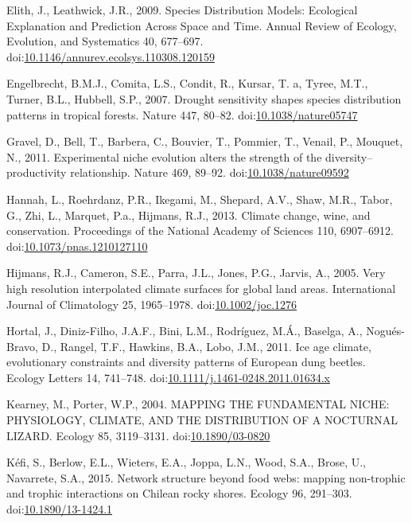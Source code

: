 \hypertarget{ref-Elith2009a}{}
Elith, J., Leathwick, J.R., 2009. Species Distribution Models:
Ecological Explanation and Prediction Across Space and Time. Annual
Review of Ecology, Evolution, and Systematics 40, 677--697.
doi:\href{https://doi.org/10.1146/annurev.ecolsys.110308.120159}{10.1146/annurev.ecolsys.110308.120159}

\hypertarget{ref-Engelbrecht2007}{}
Engelbrecht, B.M.J., Comita, L.S., Condit, R., Kursar, T. a, Tyree,
M.T., Turner, B.L., Hubbell, S.P., 2007. Drought sensitivity shapes
species distribution patterns in tropical forests. Nature 447, 80--82.
doi:\href{https://doi.org/10.1038/nature05747}{10.1038/nature05747}

\hypertarget{ref-Gravel2011c}{}
Gravel, D., Bell, T., Barbera, C., Bouvier, T., Pommier, T., Venail, P.,
Mouquet, N., 2011. Experimental niche evolution alters the strength of
the diversity--productivity relationship. Nature 469, 89--92.
doi:\href{https://doi.org/10.1038/nature09592}{10.1038/nature09592}

\hypertarget{ref-Hannah2013}{}
Hannah, L., Roehrdanz, P.R., Ikegami, M., Shepard, A.V., Shaw, M.R.,
Tabor, G., Zhi, L., Marquet, P.a., Hijmans, R.J., 2013. Climate change,
wine, and conservation. Proceedings of the National Academy of Sciences
110, 6907--6912.
doi:\href{https://doi.org/10.1073/pnas.1210127110}{10.1073/pnas.1210127110}

\hypertarget{ref-Hijmans2005}{}
Hijmans, R.J., Cameron, S.E., Parra, J.L., Jones, P.G., Jarvis, A.,
2005. Very high resolution interpolated climate surfaces for global land
areas. International Journal of Climatology 25, 1965--1978.
doi:\href{https://doi.org/10.1002/joc.1276}{10.1002/joc.1276}

\hypertarget{ref-Hortal2011}{}
Hortal, J., Diniz-Filho, J.A.F., Bini, L.M., Rodríguez, M.Á., Baselga,
A., Nogués-Bravo, D., Rangel, T.F., Hawkins, B.A., Lobo, J.M., 2011. Ice
age climate, evolutionary constraints and diversity patterns of European
dung beetles. Ecology Letters 14, 741--748.
doi:\href{https://doi.org/10.1111/j.1461-0248.2011.01634.x}{10.1111/j.1461-0248.2011.01634.x}

\hypertarget{ref-Kearney2004}{}
Kearney, M., Porter, W.P., 2004. MAPPING THE FUNDAMENTAL NICHE:
PHYSIOLOGY, CLIMATE, AND THE DISTRIBUTION OF A NOCTURNAL LIZARD. Ecology
85, 3119--3131.
doi:\href{https://doi.org/10.1890/03-0820}{10.1890/03-0820}

\hypertarget{ref-Kefi2015}{}
Kéfi, S., Berlow, E.L., Wieters, E.A., Joppa, L.N., Wood, S.A., Brose,
U., Navarrete, S.A., 2015. Network structure beyond food webs: mapping
non-trophic and trophic interactions on Chilean rocky shores. Ecology
96, 291--303.
doi:\href{https://doi.org/10.1890/13-1424.1}{10.1890/13-1424.1}

